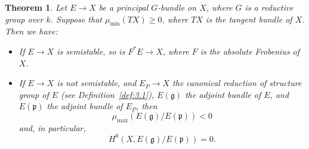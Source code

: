\documentclass[12pt]{article}
\newtheorem{theorem}[proposition]{Theorem}
\begin{document}
\begin{theorem}\label{thm:4.1}
Let $E \to X$ be a principal $G$-bundle on $X$, where $G$ is a reductive group over $k$. Suppose that $\mu_{\min}(TX) \geq 0$, where $TX$ is the tangent bundle of $X$. Then we have:
\begin{itemize}
    \item[(i)] If $E \to X$ is semistable, so is $F^*E \to X$, where $F$ is the absolute Frobenius of $X$.
    \item[(ii)] If $E \to X$ is not semistable, and $E_P \to X$ the canonical reduction of structure group of $E$ (see Definition~\ref{def:3.1}), $E(\mathfrak{g})$ the adjoint bundle of $E$, and $E(\mathfrak{p})$ the adjoint bundle of $E_P$, then
    \[
    \mu_{\max}(E(\mathfrak{g})/E(\mathfrak{p})) < 0
    \]
    and, in particular,
    \[
    H^0(X, E(\mathfrak{g})/E(\mathfrak{p})) = 0.
    \]
\end{itemize}
\end{theorem}
\end{document}
